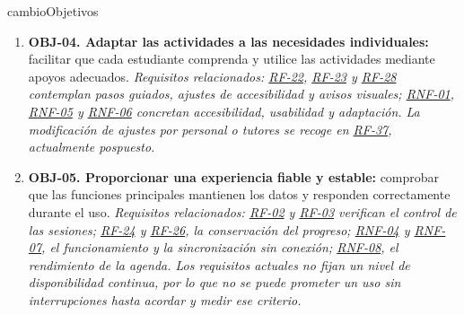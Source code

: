 \begin{cambiocontenido}{cambioObjetivos}
\begin{enumerate}[leftmargin=*]
  \item \textbf{OBJ-04. Adaptar las actividades a las necesidades individuales:} facilitar que cada estudiante comprenda y utilice las actividades mediante apoyos adecuados. \emph{Requisitos relacionados: \hyperlink{rf-22}{RF-22}, \hyperlink{rf-23}{RF-23} y \hyperlink{rf-28}{RF-28} contemplan pasos guiados, ajustes de accesibilidad y avisos visuales; \hyperlink{rnf-01}{RNF-01}, \hyperlink{rnf-05}{RNF-05} y \hyperlink{rnf-06}{RNF-06} concretan accesibilidad, usabilidad y adaptación. La modificación de ajustes por personal o tutores se recoge en \hyperlink{rf-37}{RF-37}, actualmente pospuesto.}
  \item \textbf{OBJ-05. Proporcionar una experiencia fiable y estable:} comprobar que las funciones principales mantienen los datos y responden correctamente durante el uso. \emph{Requisitos relacionados: \hyperlink{rf-02}{RF-02} y \hyperlink{rf-03}{RF-03} verifican el control de las sesiones; \hyperlink{rf-24}{RF-24} y \hyperlink{rf-26}{RF-26}, la conservación del progreso; \hyperlink{rnf-04}{RNF-04} y \hyperlink{rnf-07}{RNF-07}, el funcionamiento y la sincronización sin conexión; \hyperlink{rnf-08}{RNF-08}, el rendimiento de la agenda. Los requisitos actuales no fijan un nivel de disponibilidad continua, por lo que no se puede prometer un uso sin interrupciones hasta acordar y medir ese criterio.}
\end{enumerate}
\end{cambiocontenido}
